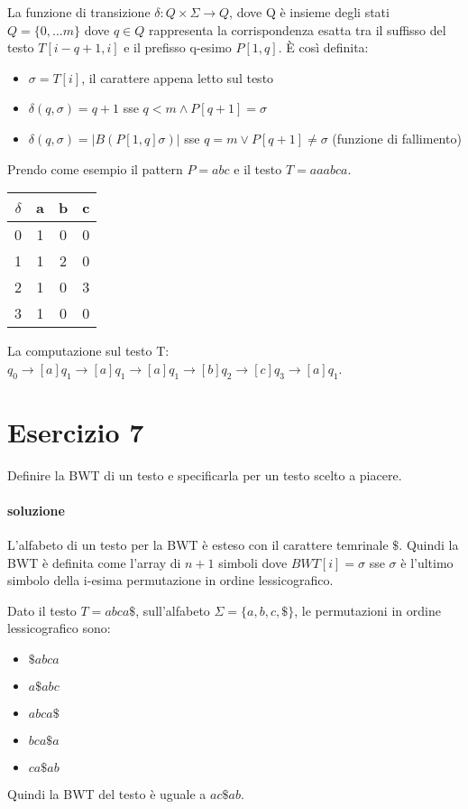 La funzione di transizione $\delta : Q \times \Sigma \rightarrow Q$, dove Q \`e insieme degli stati $Q = \{0, ... m\}$ dove $q \in Q$ rappresenta la corrispondenza esatta tra il suffisso del testo $T[i-q+1,i]$ e il prefisso q-esimo $P[1,q]$.
\`E cos\`i definita:

\begin{itemize}
  \item $\sigma = T[i]$, il carattere appena letto sul testo
  \item $\delta(q, \sigma) = q+1$ sse $q < m \land P[q+1] = \sigma$
  \item $\delta(q, \sigma) = |B(P[1,q]\sigma)|$ sse $q = m \lor P[q+1] \neq \sigma$ (funzione di fallimento)
\end{itemize}

Prendo come esempio il pattern $P = abc$ e il testo $T = aaabca$.

\begin{center}
  \begin{tabular}{|c c c c|}
    $\delta$ & a & b & c \\ \hline
    0 & 1 & 0 & 0 \\ \hline
    1 & 1 & 2 & 0 \\ \hline
    2 & 1 & 0 & 3 \\ \hline
    3 & 1 & 0 & 0 \\ \hline
  \end{tabular}
\end{center}

La computazione sul testo T: $q_0 \xrightarrow{}[a] q_1 \xrightarrow{}[a] q_1 \xrightarrow{}[a] q_1 \xrightarrow{}[b] q_2 \xrightarrow{}[c] q_3 \xrightarrow{}[a] q_1$.

\section{Esercizio 7}

Definire la BWT di un testo e specificarla per un testo scelto a piacere.

\paragraph{soluzione}

L'alfabeto di un testo per la BWT \`e esteso con il carattere temrinale $\$$. Quindi la BWT \`e definita come l'array di $n+1$ simboli dove $BWT[i] = \sigma$ sse $\sigma$ \`e l'ultimo simbolo della i-esima permutazione in ordine lessicografico.

Dato il testo $T = abca\$$, sull'alfabeto $\Sigma = \{a,b,c,\$\}$, le permutazioni in ordine lessicografico sono:

\begin{itemize}
  \item $\$abca$
  \item $a\$abc$
  \item $abca\$$
  \item $bca\$a$
  \item $ca\$ab$
\end{itemize}

Quindi la BWT del testo \`e uguale a $ac\$ab$.
